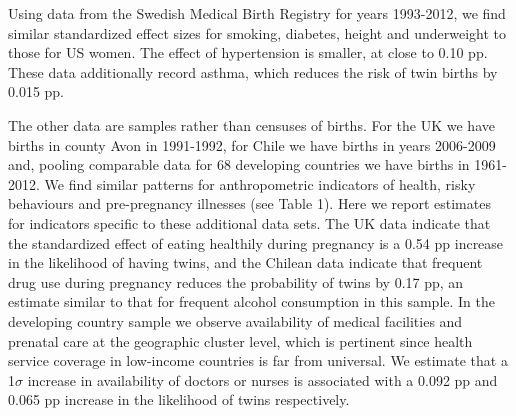 \documentclass{nature}
\begin{document}
\begin{linenumbers}
Using data from the Swedish Medical Birth Registry for years 1993-2012, we find similar standardized effect sizes for smoking, diabetes, height and underweight to those for US women. The effect of hypertension is smaller, at close to 0.10 pp. These data additionally record asthma, which reduces the risk of twin births by 0.015 pp. %

The other data are samples rather than censuses of births. For the UK we have births in county Avon in 1991-1992, for Chile we have births in years 2006-2009 and, pooling comparable data for 68 developing countries we have births in 1961-2012. We find similar patterns for anthropometric indicators of health, risky behaviours and pre-pregnancy illnesses (see Table 1). Here we report estimates for indicators specific to these additional data sets. %
The UK data indicate that the standardized effect of eating healthily during pregnancy is a 0.54 pp increase in the likelihood of having twins, 
and the Chilean data indicate that frequent drug use during pregnancy reduces the probability of twins by 0.17 pp, an estimate similar to that for frequent alcohol consumption in this sample. In the developing country sample we observe availability of medical facilities and prenatal care at the geographic cluster level, which is pertinent since health service coverage in low-income countries is far from universal. We estimate that a 1$\sigma$ increase in  availability of doctors or nurses is associated with a 0.092 pp and 0.065 pp increase in the likelihood of twins respectively. %


\end{linenumbers}
\end{document}
